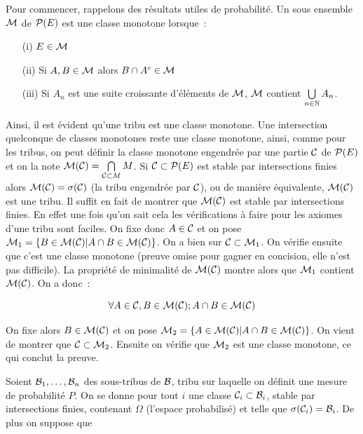 Pour commencer, rappelons des résultats utiles de probabilité.
Un sous ensemble $\mathcal{M}$ de $\mathcal{P}(E)$ est une classe monotone lorsque~:
\begin{itemize}
\item[(i)]{} $E\in \mathcal{M}$\par
\item[(ii)]{} Si $A, B\in \mathcal{M}$ alors $B\cap A^c\in \mathcal{M}$\par
\item[(iii)]{} Si $A_n$ est une suite croissante d'éléments de $\mathcal{M}$, $\mathcal{M}$ contient 
$\bigcup\limits_{n\in\mathbb{N}} A_n$.
\end{itemize}\par
Ainsi, il est évident qu'une tribu est une classe monotone. Une intersection quelconque de
classes monotones reste une classe monotone, ainsi, comme pour les tribus, on peut définir la 
classe monotone engendrée par une partie $\mathcal{C}$ de $\mathcal{P}(E)$ et on la note $\mathcal{M}(\mathcal{C})=
\bigcap\limits_{\mathcal{C}\subset M}M$.
 Si $\mathcal{C}\subset\mathcal{P}(E)$ est stable par intersections 
finies alors $\mathcal{M}(\mathcal{C}) = \sigma(\mathcal{C})$ (la tribu engendrée par $\mathcal{C}$), ou de manière équivalente, $\mathcal{M}(\mathcal{C})$ est une tribu.
\dem Il suffit en fait de montrer que $\mathcal{M}(\mathcal{C})$ est stable par intersections finies. En effet
une fois qu'on sait cela les vérifications à faire pour les axiomes d'une tribu sont faciles.
On fixe donc $A\in \mathcal{C}$ et on pose $\mathcal{M}_1 = \{B\in\mathcal{M}(\mathcal{C})|A\cap B\in\mathcal{M}(\mathcal{C})\}$. On a
bien sur $\mathcal{C}\subset \mathcal{M}_1$. On vérifie ensuite que c'est une classe monotone (preuve omise pour
gagner en concision, elle n'est pas difficile). La propriété de minimalité de $\mathcal{M}(\mathcal{C})$ montre
alors que $\mathcal{M}_1$ contient $\mathcal{M}(\mathcal{C})$. On a donc~:\par
$$\forall A\in\mathcal{C}, B\in\mathcal{M}(\mathcal{C}); A\cap B\in\mathcal{M}(\mathcal{C})$$\par
On fixe alors $B\in \mathcal{M}(\mathcal{C})$ et on pose $\mathcal{M}_2 = \{A\in\mathcal{M}(\mathcal{C})|A\cap B\in\mathcal{M}(\mathcal{C})\}$.
On vient de montrer que $\mathcal{C}\subset\mathcal{M}_2$. Ensuite on vérifie que $\mathcal{M}_2$ est une classe 
monotone, ce qui conclut la preuve.\hfill\fbox{{}}\par
\proposition Soient $\mathcal{B}_1, \ldots, \mathcal{B}_n$ des sous-tribus de $\mathcal{B}$, tribu
sur laquelle on définit une mesure de probabilité $P$. On se donne pour tout $i$ une classe 
$\mathcal{C}_i\subset\mathcal{B}_i$, stable par intersections finies, contenant $\Omega$ (l'espace probabilisé)
et telle que $\sigma(\mathcal{C}_i) = \mathcal{B}_i$. De plus on suppose que 
